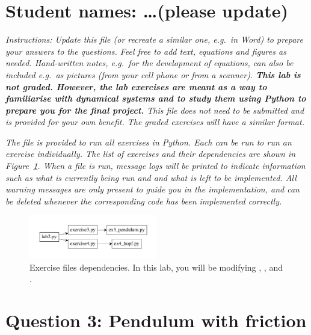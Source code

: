 \documentclass{cmc}
\begin{document}
\pagestyle{fancy}
 

\section*{Student names: \ldots (please update)}

\textit{Instructions: Update this file (or recreate a similar one, e.g.\ in
  Word) to prepare your answers to the questions. Feel free to add text,
  equations and figures as needed. Hand-written notes, e.g.\ for the development
  of equations, can also be included e.g.\ as pictures (from your cell phone or
  from a scanner).  \textbf{This lab is not graded. However, the lab exercises
    are meant as a way to familiarise with dynamical systems and to study them
    using Python to prepare you for the final project.} This file does not need
  to be submitted and is provided for your own benefit. The graded exercises
  will have a similar format.}

\textit{The file  is provided to run all exercises in
  Python. Each  can be run to run an exercise
  individually. The list of exercises and their dependencies are shown in
  Figure~\ref{fig:files}. When a file is run, message logs will be printed to
  indicate information such as what is currently being run and and what is left
  to be implemented. All warning messages are only present to guide you in the
  implementation, and can be deleted whenever the corresponding code has been
  implemented correctly.}

\begin{figure}[ht]
  \centering \includegraphics[width=0.5\textwidth]{figures/files}
  \caption{\label{fig:files} Exercise files dependencies. In this lab, you will
    be modifying , ,
     and .}
\end{figure}

\section*{Question 3: Pendulum with friction}
\end{document}
